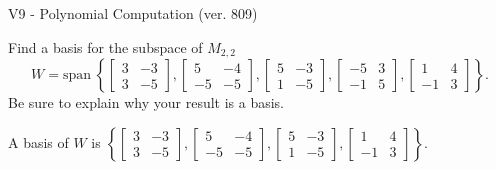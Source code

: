 \begin{exercise}
  \begin{exerciseTitle}V9 - Polynomial Computation (ver. 809)\end{exerciseTitle}
  \begin{exerciseStatement}
    Find a basis for the subspace of \(M_{2,2}\) 
\[W=\mathrm{span}\ \left\{\left[\begin{array}{cc}
3 & -3 \\
3 & -5
\end{array}\right] , \left[\begin{array}{cc}
5 & -4 \\
-5 & -5
\end{array}\right] , \left[\begin{array}{cc}
5 & -3 \\
1 & -5
\end{array}\right] , \left[\begin{array}{cc}
-5 & 3 \\
-1 & 5
\end{array}\right] , \left[\begin{array}{cc}
1 & 4 \\
-1 & 3
\end{array}\right]\right\}.\]
 Be sure to explain why your result is a basis.


  \end{exerciseStatement}
  \begin{exerciseAnswer}
   A basis of \(W\) is  \(\left\{\left[\begin{array}{cc}
3 & -3 \\
3 & -5
\end{array}\right] , \left[\begin{array}{cc}
5 & -4 \\
-5 & -5
\end{array}\right] , \left[\begin{array}{cc}
5 & -3 \\
1 & -5
\end{array}\right] , \left[\begin{array}{cc}
1 & 4 \\
-1 & 3
\end{array}\right]\right\}\).
  


  \end{exerciseAnswer}
\end{exercise}